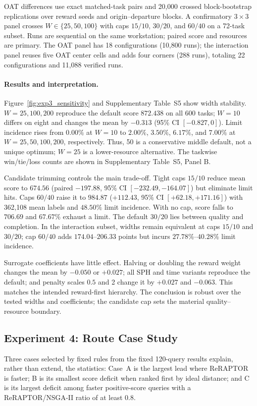 OAT differences use exact matched-task pairs and 20,000 crossed block-bootstrap
replications over reward seeds and origin--departure blocks. A confirmatory
\(3\times3\) panel crosses \(W\in\{25,50,100\}\) with caps \(15/10\),
\(30/20\), and \(60/40\) on a 72-task subset. Runs are sequential on the same
workstation; paired score and resources are primary. The OAT panel has 18
configurations (10,800 runs); the interaction panel reuses five OAT center cells
and adds four corners (288 runs), totaling 22 configurations and 11,088 verified runs.

\paragraph{Results and interpretation.}
Figure~\ref{fig:exp3_sensitivity} and Supplementary Table~S5
show width stability.
\(W=25,100,200\) reproduce the default score \(872.438\) on all 600 tasks;
\(W=10\) differs on eight and changes the mean by \(-0.313\) (95\% CI
\([-0.827,0]\)). Limit incidence rises from \(0.00\%\) at \(W=10\) to
\(2.00\%\), \(3.50\%\), \(6.17\%\), and \(7.00\%\) at
\(W=25,50,100,200\), respectively. Thus, 50 is a conservative middle default,
not a unique optimum; \(W=25\) is a lower-resource alternative. The taskwise
win/tie/loss counts are shown in Supplementary Table~S5, Panel B.

Candidate trimming controls the main trade-off. Tight caps \(15/10\) reduce
mean score to \(674.56\) (paired \(-197.88\), 95\% CI
\([-232.49,-164.07]\)) but eliminate limit hits. Caps \(60/40\) raise it to
\(984.87\) (\(+112.43\), 95\% CI \([+62.18,+171.16]\)) with 362,108 mean
labels and \(48.50\%\) limit incidence. With no cap, score falls to \(706.69\)
and \(67.67\%\) exhaust a limit. The default \(30/20\) lies between quality and
completion. In the interaction subset, widths remain equivalent at caps
\(15/10\) and \(30/20\); cap \(60/40\) adds \(174.04\)--\(206.33\) points but incurs
\(27.78\%\)--\(40.28\%\) limit incidence.

Surrogate coefficients have little effect. Halving or doubling the reward
weight changes the mean by \(-0.050\) or \(+0.027\); all SPH and time variants
reproduce the default; and penalty scales \(0.5\) and 2 change it by \(+0.027\)
and \(-0.063\). This matches the intended reward-first hierarchy. The
conclusion is robust over the tested widths and coefficients; the candidate cap
sets the material quality--resource boundary.

\subsection{Experiment 4: Route Case Study}
Three cases selected by fixed rules from the fixed 120-query results explain,
rather than extend, the statistics: Case~A is the largest lead where ReRAPTOR
is faster; B is its smallest score deficit when ranked first by ideal distance;
and C is its largest deficit among faster positive-score queries with a
ReRAPTOR/NSGA-II ratio of at least 0.8.

